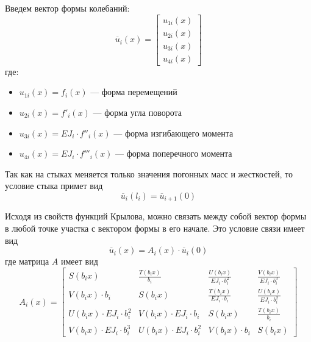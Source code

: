 Введем вектор формы колебаний:
\begin{equation}
    \label{eq6}
    \overline{u}_i(x) = 
    \begin{bmatrix}
        u_{1i}(x)
        \\
        u_{2i}(x)
        \\
        u_{3i}(x)
        \\
        u_{4i}(x)
    \end{bmatrix}
\end{equation}
где:
\begin{itemize}
    \item $u_{1i}(x) = f_i(x)$ --- форма перемещений
    \item $u_{2i}(x) = f'_i(x)$ --- форма угла поворота
    \item $u_{3i}(x) = EJ_i \cdot f''_i(x)$ --- форма изгибающего момента
    \item $u_{4i}(x) = EJ_i \cdot f'''_i(x)$ --- форма поперечного момента
\end{itemize}

Так как на стыках меняется только значения погонных масс и жесткостей, то условие стыка примет вид
\begin{equation}
    \label{eq7}
    \overline{u}_i(l_i) = \overline{u}_{i+1}(0)
\end{equation}

Исходя из свойств функций Крылова, можно связать между собой вектор формы в любой точке участка с вектором формы в его начале. Это условие связи имеет вид
\begin{equation}
    \label{eq8}
    \overline{u}_i(x) = A_i(x) \cdot \overline{u}_i(0)
\end{equation}
где матрица $A$ имеет вид
\begin{equation}
    \label{eq9}
    A_i(x) = 
    \begin{bmatrix}
        S(b_ix) & \displaystyle \frac{T(b_ix)}{b_i} & \displaystyle \frac{U(b_ix)}{EJ_i \cdot b_i^2} & \displaystyle \frac{V(b_ix)}{EJ_i \cdot b_i^3}
        \\[10pt]
        V(b_ix) \cdot b_i & S(b_ix) & \displaystyle \frac{T(b_ix)}{EJ_i \cdot b_i} & \displaystyle \frac{U(b_ix)}{EJ_i \cdot b_i^2}
        \\[10pt]
        U(b_ix) \cdot EJ_i \cdot b_i^2 & V(b_ix) \cdot EJ_i \cdot b_i & S(b_ix) & \displaystyle \frac{T(b_ix)}{b_i}
        \\[10pt]
        V(b_ix) \cdot EJ_i \cdot b_i^3 & U(b_ix) \cdot EJ_i \cdot b_i^2 & V(b_ix) \cdot b_i & S(b_ix)
    \end{bmatrix}
\end{equation}

